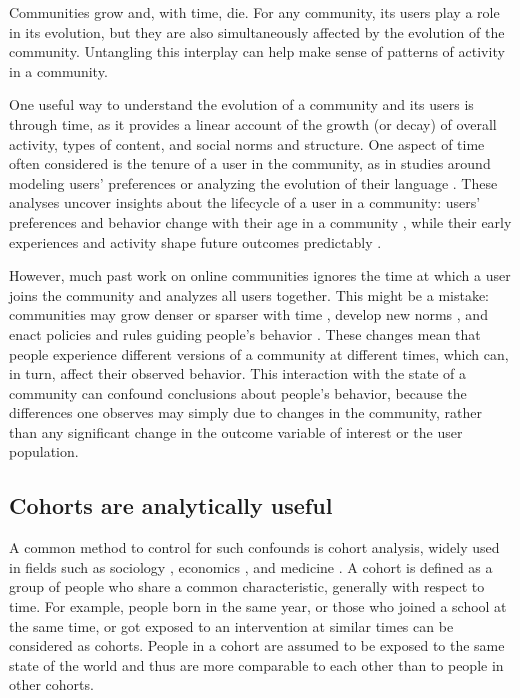 \documentclass[10pt, oneside, onecolumn]{article}
\begin{document}
Communities grow and, with time, die. For any community, its users play a role in its evolution, but they are also simultaneously affected by the evolution of the community. Untangling this interplay can help make sense of patterns of activity in a community.

One useful way to understand the evolution of a community and its users is through time, as it provides a linear account of the growth (or decay) of overall activity, types of content, and social norms and structure.  One aspect of time often considered is the tenure of a user in the community, as in studies around modeling users' preferences \cite{McAuley2013} or analyzing the evolution of their language \cite{Danescu-niculescu-mizil2013}.  These analyses uncover insights about the lifecycle of a user in a community: users' preferences and behavior change with their age in a community \cite{Panciera2010}, while their early experiences and activity shape future outcomes predictably \cite{Tan2015,Yang2009,Panciera2009, Miller2015}. 

However, much past work on online communities ignores the time at which a user joins the community and analyzes all users together.
This might be a mistake: communities may grow denser or sparser with time \cite{Leskovec2005}, develop new norms \cite{Kooti2010}, and enact policies and rules guiding people's behavior \cite{Butler2008}.
These changes mean that people experience different versions of a community at different times, which can, in turn, affect their observed behavior. This interaction with the state of a community can confound conclusions about people's behavior, because the differences one observes may simply due to changes in the community, rather than any significant change in the outcome variable of interest or the user population.  


\subsection{Cohorts are analytically useful}

A common method to control for such confounds is cohort analysis, widely used in fields such as sociology \cite{Mason2012,Glenn2005}, economics \cite{Attanasio1993,Beldona2005}, and medicine \cite{Howartz1996,Davis2010}. A cohort is defined as a group of people who share a common characteristic, generally with respect to time. For example, people born in the same year, or those who joined a school at the same time, or got exposed to an intervention at similar times can be considered as cohorts.  People in a cohort are assumed to be exposed to the same state of the world and thus are more comparable to each other than to people in other cohorts. 
\end{document}
